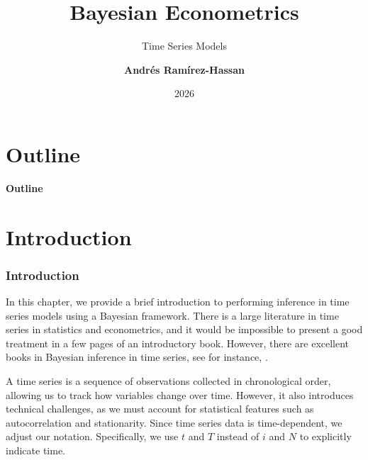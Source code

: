 \documentclass[12pt, compress]{beamer}
\title{Bayesian Econometrics}
\subtitle{Time Series Models}
\date{2026}
\author[Andr\'e Ram\'irez H.]{\textbf{Andr\'es Ram\'irez-Hassan}}
\institute[EAFIT]{\small{Universidad EAFIT\\School of Finance, Economics and Government}}
\begin{document}
	
	\maketitle
	
	
	
	
	\section*{Outline}
	\begin{frame}
		\textbf{\Large{Outline}}
		\tableofcontents
	\end{frame}
	
\section{Introduction}
	
\begin{frame}
	\frametitle{Introduction}
In this chapter, we provide a brief introduction to performing inference in time series models using a Bayesian framework. There is a large literature in time series in statistics and econometrics, and it would be impossible to present a good treatment in a few pages of an introductory book. However, there are excellent books in Bayesian inference in time series, see for instance, \cite{west2006bayesian,petris2009dynamic,pole2018applied}.

A time series is a sequence of observations collected in chronological order, allowing us to track how variables change over time. However, it also introduces technical challenges, as we must account for statistical features such as autocorrelation and stationarity. Since time series data is time-dependent, we adjust our notation. Specifically, we use $t$ and $T$ instead of $i$ and $N$ to explicitly indicate time.
\end{frame}
\end{document}
